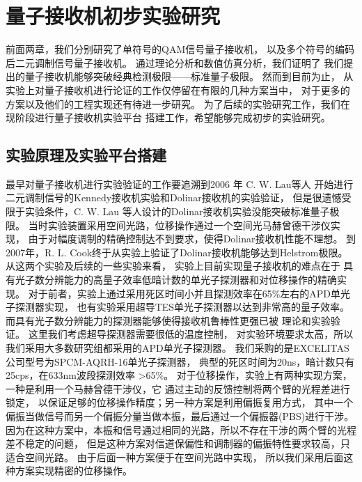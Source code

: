 \chapter{量子接收机初步实验研究}
前面两章，我们分别研究了单符号的QAM信号量子接收机，
以及多个符号的编码后二元调制信号量子接收机。
通过理论分析和数值仿真分析，我们证明了
我们提出的量子接收机能够突破经典检测极限——标准量子极限。
然而到目前为止，
从实验上对量子接收机进行论证的工作仅停留在有限的几种方案当中，
对于更多的方案以及他们的工程实现还有待进一步研究。
为了后续的实验研究工作，我们在现阶段进行量子接收机实验平台
搭建工作，希望能够完成初步的实验研究。


\section{实验原理及实验平台搭建}
最早对量子接收机进行实验验证的工作要追溯到2006 年 C. W. Lau等人
开始进行二元调制信号的Kennedy接收机实验和Dolinar接收机的实验验证\cite{lau2006binary}，
但是很遗憾受限于实验条件，C. W. Lau 等人设计的Dolinar接收机实验没能突破标准量子极限。
当时实验装置采用空间光路，位移操作通过一个空间光马赫曾德干涉仪实现，
由于对幅度调制的精确控制达不到要求，使得Dolinar接收机性能不理想。
到2007年，R. L. Cook终于从实验上验证了Dolinar接收机能够达到Helstrom极限\cite{cook2007optical}。
从这两个实验及后续的一些实验来看\cite{wittmann2008demonstration,wittmann2010demonstration,tsujino2010sub,
tsujino2011quantum,becerra2011m,chen2012optical,muller2012quadrature,becerra2013experimental,
becerra2015photon}，
实验上目前实现量子接收机的难点在于
具有光子数分辨能力的高量子效率低暗计数的单光子探测器和对位移操作的精确实现。
对于前者，实验上通过采用死区时间小并且探测效率在65\%左右的APD单光子探测器实现，
也有实验采用超导TES单光子探测器以达到非常高的量子效率\cite{tsujino2011quantum}。
而具有光子数分辨能力的探测器能够使得接收机鲁棒性更强已被
理论和实验验证\cite{izumi2013quantum,li2013suppressing,becerra2015photon}。
这里我们考虑超导探测器需要很低的温度控制，
对实验环境要求太高，所以我们采用大多数研究组都采用的APD单光子探测器。
我们采购的是EXCELITAS 公司型号为SPCM-AQRH-16单光子探测器，
典型的死区时间为20ns，暗计数只有25cps，在633nm波段探测效率
>65\%。
对于位移操作，实验上有两种实现方案，一种是利用一个马赫曾德干涉仪，它
通过主动的反馈控制将两个臂的光程差进行锁定，
以保证足够的位移操作精度\cite{becerra2013experimental,
becerra2015photon}；另一种方案是利用偏振复用方式，
其中一个偏振当做信号而另一个偏振分量当做本振，最后通过一个偏振器(PBS)进行干涉\cite{wittmann2008demonstration,wittmann2010demonstration}。
因为在这种方案中，本振和信号通过相同的光路，所以不存在干涉的两个臂的光程差不稳定的问题，
但是这种方案对信道保偏性和调制器的偏振特性要求较高，只适合空间光路。
由于后面一种方案便于在空间光路中实现，
所以我们采用后面这种方案实现精密的位移操作。


